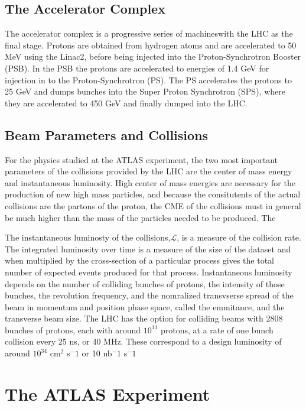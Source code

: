 \subsection{The Accelerator Complex}

The accelerator complex is a progressive series of machineswith the LHC as the final stage.
Protons are obtained from hydrogen atoms and are accelerated to 50 MeV using the
Linac2, before being injected into the Proton-Synchrotron Booster (PSB). In
the PSB the protons are accelerated to energies of 1.4 GeV for injection
in to the Proton-Synchrotron (PS). The PS accelerates the protons to 25 GeV
and dumps bunches into the Super Proton Synchrotron (SPS), where they 
are accelerated to 450 GeV and finally dumped into the LHC. 

\subsection{Beam Parameters and Collisions} 

For the physics studied at the ATLAS experiment, the two most important parameters of
the collisions provided by the LHC are the center of mass energy and instantaneous luminosity.
High center of mass energies are necessary for the production
of new high mass particles, and because the consitutents of the actual collisions
are the partons of the proton, the CME of the collisions must in general
be much higher than the mass of the particles needed to be produced. The

The instantaneous luminosty of the collisions,$\mathcal{L}$, is a measure of the
collision rate. The integrated luminosity over time is a measure of the size
of the dataset and when multiplied by the cross-section of a particular process
gives the total number of expected events produced for that process.
Instantaneous luminosity depends on the number of colliding bunches of protons,
the intensity of those bunches, the revolution
frequency, and the nomralized transvserse spread of the beam in momentum and position
phase space, called the emmitance, and the transverse beam size. The LHC has the
option for colliding beams with 2808 bunches of protons, each with around $10^11$ protons,
at a rate of one bunch collision every 25 ns, or 40 MHz. These correspond
to a design luminosity of around $10^34$ cm$^{2}$ s$^-1$ or 10 nb$^-1$ s$^-1$
  

\section{The ATLAS Experiment}

